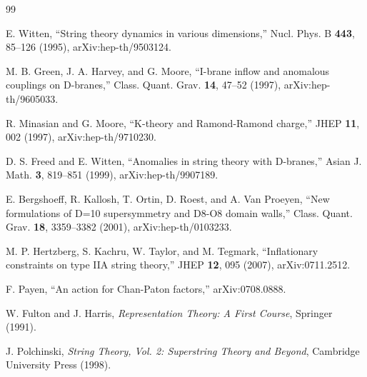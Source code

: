 \documentclass[11pt]{article}
\theoremstyle{plain}
\theoremstyle{definition}
\begin{document}
\begin{thebibliography}{99}

E. Witten,
``String theory dynamics in various dimensions,''
Nucl. Phys. B \textbf{443}, 85--126 (1995),
arXiv:hep-th/9503124.

M. B. Green, J. A. Harvey, and G. Moore,
``I-brane inflow and anomalous couplings on D-branes,''
Class. Quant. Grav. \textbf{14}, 47--52 (1997),
arXiv:hep-th/9605033.

R. Minasian and G. Moore,
``K-theory and Ramond-Ramond charge,''
JHEP \textbf{11}, 002 (1997),
arXiv:hep-th/9710230.

D. S. Freed and E. Witten,
``Anomalies in string theory with D-branes,''
Asian J. Math. \textbf{3}, 819--851 (1999),
arXiv:hep-th/9907189.

E. Bergshoeff, R. Kallosh, T. Ortin, D. Roest, and A. Van Proeyen,
``New formulations of D=10 supersymmetry and D8-O8 domain walls,''
Class. Quant. Grav. \textbf{18}, 3359--3382 (2001),
arXiv:hep-th/0103233.

M. P. Hertzberg, S. Kachru, W. Taylor, and M. Tegmark,
``Inflationary constraints on type IIA string theory,''
JHEP \textbf{12}, 095 (2007),
arXiv:0711.2512.

F. Payen,
``An action for Chan-Paton factors,''
arXiv:0708.0888.

W. Fulton and J. Harris,
\emph{Representation Theory: A First Course},
Springer (1991).

J. Polchinski,
\emph{String Theory, Vol. 2: Superstring Theory and Beyond},
Cambridge University Press (1998).

\end{thebibliography}
\end{document}
